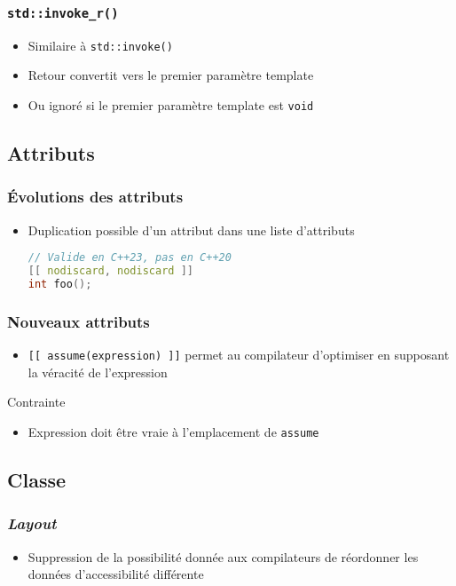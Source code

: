 \documentclass[C++.tex]{subfiles}
\begin{document}
\begin{frame}[fragile]
	\frametitle{\lstinline|std::invoke_r()|}
	\begin{itemize}
		\item Similaire à \lstinline|std::invoke()|
		\item Retour convertit vers le premier paramètre template
		\item Ou ignoré si le premier paramètre template est \lstinline|void|
	\end{itemize}
\end{frame}

\subsection*{Attributs}
\begin{frame}[fragile]
	\frametitle{Évolutions des attributs}
	\begin{itemize}
		\item Duplication possible d'un attribut dans une liste d'attributs

		\begin{lstlisting}[language=C++]
// Valide en C++23, pas en C++20
[[ nodiscard, nodiscard ]]
int foo();\end{lstlisting}
	\end{itemize}
\end{frame}

\begin{frame}[fragile]
	\frametitle{Nouveaux attributs}
	\begin{itemize}
		\item \lstinline|[[ assume(expression) ]]| permet au compilateur d'optimiser en supposant la véracité de l'expression
	\end{itemize}

	\begin{alertblock}{Contrainte}
		\begin{itemize}
			\item Expression doit être vraie à l'emplacement de \lstinline|assume|

		\end{itemize}
	\end{alertblock}
\end{frame}

\subsection*{Classe}
\begin{frame}[fragile]
	\frametitle{\textit{Layout}}
	\begin{itemize}
		\item Suppression de la possibilité donnée aux compilateurs de réordonner les données d'accessibilité différente
	\end{itemize}
\end{frame}
\end{document}
